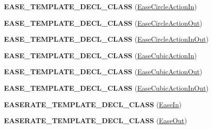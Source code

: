 \begin{DoxyCompactItemize}
{\bfseries E\+A\+S\+E\+\_\+\+T\+E\+M\+P\+L\+A\+T\+E\+\_\+\+D\+E\+C\+L\+\_\+\+C\+L\+A\+SS} (\hyperlink{classEaseCircleActionIn}{Ease\+Circle\+Action\+In})
\item 
\mbox{\label{group__actions_ga37c52737b3cf5759e4da8569a56f71d6}} 
{\bfseries E\+A\+S\+E\+\_\+\+T\+E\+M\+P\+L\+A\+T\+E\+\_\+\+D\+E\+C\+L\+\_\+\+C\+L\+A\+SS} (\hyperlink{classEaseCircleActionOut}{Ease\+Circle\+Action\+Out})
\item 
\mbox{\label{group__actions_ga8ede54e3ab44b3c438860e9279a23f02}} 
{\bfseries E\+A\+S\+E\+\_\+\+T\+E\+M\+P\+L\+A\+T\+E\+\_\+\+D\+E\+C\+L\+\_\+\+C\+L\+A\+SS} (\hyperlink{classEaseCircleActionInOut}{Ease\+Circle\+Action\+In\+Out})
\item 
\mbox{\label{group__actions_ga7fe526cd49d3a807b636656902861e3d}} 
{\bfseries E\+A\+S\+E\+\_\+\+T\+E\+M\+P\+L\+A\+T\+E\+\_\+\+D\+E\+C\+L\+\_\+\+C\+L\+A\+SS} (\hyperlink{classEaseCubicActionIn}{Ease\+Cubic\+Action\+In})
\item 
\mbox{\label{group__actions_ga80b1bd705ff456304261b8a83ef90608}} 
{\bfseries E\+A\+S\+E\+\_\+\+T\+E\+M\+P\+L\+A\+T\+E\+\_\+\+D\+E\+C\+L\+\_\+\+C\+L\+A\+SS} (\hyperlink{classEaseCubicActionOut}{Ease\+Cubic\+Action\+Out})
\item 
\mbox{\label{group__actions_gabe2e3a6badf48ea531020b06dee1dfe3}} 
{\bfseries E\+A\+S\+E\+\_\+\+T\+E\+M\+P\+L\+A\+T\+E\+\_\+\+D\+E\+C\+L\+\_\+\+C\+L\+A\+SS} (\hyperlink{classEaseCubicActionInOut}{Ease\+Cubic\+Action\+In\+Out})
\item 
\mbox{\label{group__actions_ga25c53ad92ad9ecbb3250524a804409f4}} 
{\bfseries E\+A\+S\+E\+R\+A\+T\+E\+\_\+\+T\+E\+M\+P\+L\+A\+T\+E\+\_\+\+D\+E\+C\+L\+\_\+\+C\+L\+A\+SS} (\hyperlink{classEaseIn}{Ease\+In})
\item 
\mbox{\label{group__actions_ga136099e55779557e555d012212b9498c}} 
{\bfseries E\+A\+S\+E\+R\+A\+T\+E\+\_\+\+T\+E\+M\+P\+L\+A\+T\+E\+\_\+\+D\+E\+C\+L\+\_\+\+C\+L\+A\+SS} (\hyperlink{classEaseOut}{Ease\+Out})
\item 
\mbox{\label{group__actions_gac7effb8c825d24b1d37e77c1bfcac839}} 

\end{DoxyCompactItemize}
